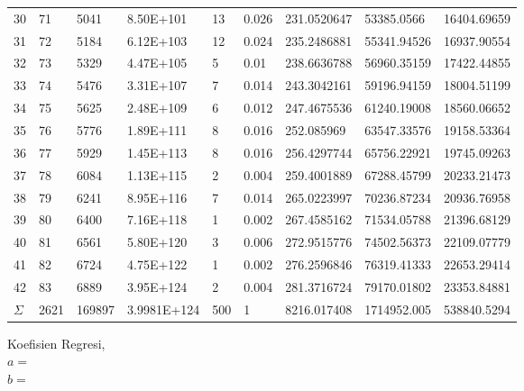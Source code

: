 \documentclass{article}
\begin{document}
\begin{longtable}{@{}lllllllll@{}}
				30  & 71   & 5041                 & 8.50E+101   & 13  & 0.026 & 231.0520647 & 53385.0566                  & 16404.69659 \\
				31  & 72   & 5184                 & 6.12E+103   & 12  & 0.024 & 235.2486881 & 55341.94526                 & 16937.90554 \\
				32  & 73   & 5329                 & 4.47E+105   & 5   & 0.01  & 238.6636788 & 56960.35159                 & 17422.44855 \\
				33  & 74   & 5476                 & 3.31E+107   & 7   & 0.014 & 243.3042161 & 59196.94159                 & 18004.51199 \\
				34  & 75   & 5625                 & 2.48E+109   & 6   & 0.012 & 247.4675536 & 61240.19008                 & 18560.06652 \\
				35  & 76   & 5776                 & 1.89E+111   & 8   & 0.016 & 252.085969  & 63547.33576                 & 19158.53364 \\
				36  & 77   & 5929                 & 1.45E+113   & 8   & 0.016 & 256.4297744 & 65756.22921                 & 19745.09263 \\
				37  & 78   & 6084                 & 1.13E+115   & 2   & 0.004 & 259.4001889 & 67288.45799                 & 20233.21473 \\
				38  & 79   & 6241                 & 8.95E+116   & 7   & 0.014 & 265.0223997 & 70236.87234                 & 20936.76958 \\
				39  & 80   & 6400                 & 7.16E+118   & 1   & 0.002 & 267.4585162 & 71534.05788                 & 21396.68129 \\
				40  & 81   & 6561                 & 5.80E+120   & 3   & 0.006 & 272.9515776 & 74502.56373                 & 22109.07779 \\
				41  & 82   & 6724                 & 4.75E+122   & 1   & 0.002 & 276.2596846 & 76319.41333                 & 22653.29414 \\
				42  & 83   & 6889                 & 3.95E+124   & 2   & 0.004 & 281.3716724 & 79170.01802                 & 23353.84881 \\* \midrule
				$\Sigma$ & 2621 & 169897               & 3.9981E+124 & 500 & 1     & 8216.017408 & 1714952.005                 & 538840.5294 \\* \bottomrule
			\end{longtable}
			\hspace{-0.6cm}Koefisien Regresi, \\
			$a = $ \\
			$b = $ \\
\end{document}
